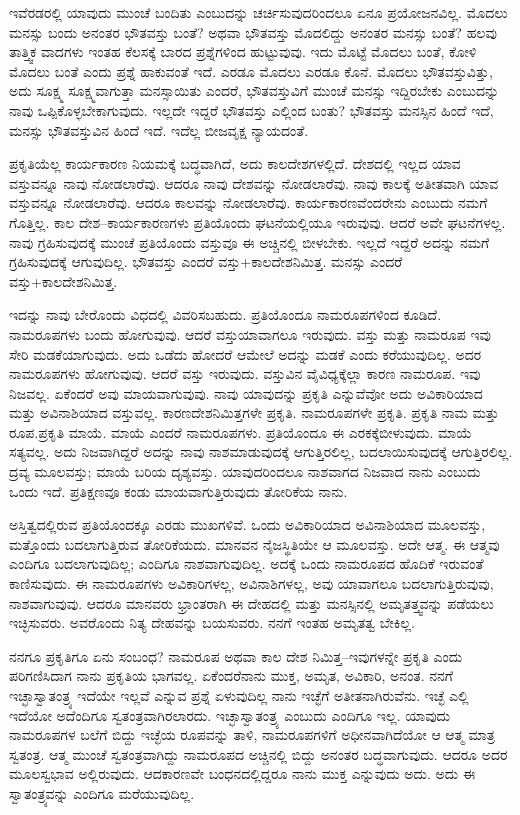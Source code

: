 ಇವೆರಡರಲ್ಲಿ ಯಾವುದು ಮುಂಚೆ ಬಂದಿತು ಎಂಬುದನ್ನು ಚರ್ಚಿಸುವುದರಿಂದಲೂ ಏನೂ ಪ್ರಯೋಜನವಿಲ್ಲ. ಮೊದಲು ಮನಸ್ಸು ಬಂದು ಅನಂತರ ಭೌತವಸ್ತು ಬಂತೆ? ಅಥವಾ ಭೌತವಸ್ತು ಮೊದಲಿದ್ದು ಅನಂತರ ಮನಸ್ಸು ಬಂತೆ? ಹಲವು ತಾತ್ತ್ವಿಕ ವಾದಗಳು ಇಂತಹ ಕೆಲಸಕ್ಕೆ ಬಾರದ ಪ್ರಶ್ನೆಗಳಿಂದ ಹುಟ್ಟುವುವು. ಇದು ಮೊಟ್ಟೆ ಮೊದಲು ಬಂತೆ, ಕೋಳಿ ಮೊದಲು ಬಂತೆ ಎಂದು ಪ್ರಶ್ನೆ ಹಾಕುವಂತೆ ಇದೆ. ಎರಡೂ ಮೊದಲು ಎರಡೂ ಕೊನೆ. ಮೊದಲು ಭೌತವಸ್ತುವಿತ್ತು, ಅದು ಸೂಕ್ಷ್ಮ ಸೂಕ್ಷ್ಮವಾಗುತ್ತಾ ಮನಸ್ಸಾಯಿತು ಎಂದರೆ, ಭೌತವಸ್ತುವಿಗೆ ಮುಂಚೆ ಮನಸ್ಸು ಇದ್ದಿರಬೇಕು ಎಂಬುದನ್ನು ನಾವು ಒಪ್ಪಿಕೊಳ್ಳಬೇಕಾಗುವುದು. ಇಲ್ಲದೇ ಇದ್ದರೆ ಭೌತವಸ್ತು ಎಲ್ಲಿಂದ ಬಂತು? ಭೌತವಸ್ತು ಮನಸ್ಸಿನ ಹಿಂದೆ ಇದೆ, ಮನಸ್ಸು ಭೌತವಸ್ತುವಿನ ಹಿಂದೆ ಇದೆ. ಇದೆಲ್ಲ ಬೀಜವೃಕ್ಷ ನ್ಯಾಯದಂತೆ.

ಪ್ರಕೃತಿಯೆಲ್ಲ ಕಾರ್ಯಕಾರಣ ನಿಯಮಕ್ಕೆ ಬದ್ಧವಾಗಿದೆ, ಅದು ಕಾಲದೇಶಗಳಲ್ಲಿದೆ. ದೇಶದಲ್ಲಿ ಇಲ್ಲದ ಯಾವ ವಸ್ತುವನ್ನೂ ನಾವು ನೋಡಲಾರೆವು. ಆದರೂ ನಾವು ದೇಶವನ್ನು ನೋಡಲಾರೆವು. ನಾವು ಕಾಲಕ್ಕೆ ಅತೀತವಾಗಿ ಯಾವ ವಸ್ತುವನ್ನೂ ನೋಡಲಾರೆವು. ಆದರೂ ಕಾಲವನ್ನು ನೋಡಲಾರೆವು. ಕಾರ್ಯಕಾರಣವೆಂದರೇನು ಎಂಬುದು ನಮಗೆ ಗೊತ್ತಿಲ್ಲ. ಕಾಲ ದೇಶ–ಕಾರ್ಯಕಾರಣಗಳು ಪ್ರತಿಯೊಂದು ಘಟನೆಯಲ್ಲಿಯೂ ಇರುವುವು. ಆದರೆ ಅವೇ ಘಟನೆಗಳಲ್ಲ. ನಾವು ಗ್ರಹಿಸುವುದಕ್ಕೆ ಮುಂಚೆ ಪ್ರತಿಯೊಂದು ವಸ್ತುವೂ ಈ ಅಚ್ಚಿನಲ್ಲಿ ಬೀಳಬೇಕು. ಇಲ್ಲದೆ ಇದ್ದರೆ ಅದನ್ನು ನಮಗೆ ಗ್ರಹಿಸುವುದಕ್ಕೆ ಆಗುವುದಿಲ್ಲ. ಭೌತವಸ್ತು ಎಂದರೆ ವಸ್ತು+ಕಾಲದೇಶನಿಮಿತ್ತ. ಮನಸ್ಸು ಎಂದರೆ ವಸ್ತು+ಕಾಲದೇಶನಿಮಿತ್ತ.

ಇದನ್ನು ನಾವು ಬೇರೊಂದು ವಿಧದಲ್ಲಿ ವಿವರಿಸಬಹುದು. ಪ್ರತಿಯೊಂದೂ ನಾಮರೂಪಗಳಿಂದ ಕೂಡಿದೆ. ನಾಮರೂಪಗಳು ಬಂದು ಹೋಗುವುವು. ಆದರೆ ವಸ್ತು\break ಯಾವಾಗಲೂ ಇರುವುದು. ವಸ್ತು ಮತ್ತು ನಾಮರೂಪ ಇವು ಸೇರಿ ಮಡಕೆಯಾಗುವುದು. ಅದು ಒಡೆದು ಹೋದರೆ ಆಮೇಲೆ ಅದನ್ನು ಮಡಕೆ ಎಂದು ಕರೆಯುವುದಿಲ್ಲ. ಅದರ ನಾಮರೂಪಗಳು ಹೋಗುವುವು. ಆದರೆ ವಸ್ತು ಇರುವುದು. ವಸ್ತುವಿನ ವೈವಿಧ್ಯಕ್ಕೆಲ್ಲಾ ಕಾರಣ ನಾಮರೂಪ. ಇವು ನಿಜವಲ್ಲ. ಏಕೆಂದರೆ ಅವು ಮಾಯವಾಗುವುವು. ನಾವು ಯಾವುದನ್ನು ಪ್ರಕೃತಿ ಎನ್ನುವೆವೋ ಅದು ಅವಿಕಾರಿಯಾದ ಮತ್ತು ಅವಿನಾಶಿಯಾದ ವಸ್ತುವಲ್ಲ. ಕಾರಣದೇಶನಿಮಿತ್ತಗಳೇ ಪ್ರಕೃತಿ. ನಾಮರೂಪಗಳೇ ಪ್ರಕೃತಿ. ಪ್ರಕೃತಿ ನಾಮ ಮತ್ತು ರೂಪ.\break ಪ್ರಕೃತಿ ಮಾಯೆ. ಮಾಯೆ ಎಂದರೆ ನಾಮರೂಪಗಳು. ಪ್ರತಿಯೊಂದೂ ಈ ಎರಕಕ್ಕೆ\break ಬೀಳುವುದು. ಮಾಯೆ ಸತ್ಯವಲ್ಲ. ಅದು ನಿಜವಾಗಿದ್ದರೆ ಅದನ್ನು ನಾವು ನಾಶಮಾಡುವುದಕ್ಕೆ ಆಗುತ್ತಿರಲಿಲ್ಲ, ಬದಲಾಯಿಸುವುದಕ್ಕೆ ಆಗುತ್ತಿರಲಿಲ್ಲ. ದ್ರವ್ಯ ಮೂಲವಸ್ತು; ಮಾಯೆ ಬರಿಯ ದೃಶ್ಯವಸ್ತು. ಯಾವುದರಿಂದಲೂ ನಾಶವಾಗದ ನಿಜವಾದ ನಾನು ಎಂಬುದು ಒಂದು ಇದೆ. ಪ್ರತಿಕ್ಷಣವೂ ಕಂಡು ಮಾಯವಾಗುತ್ತಿರುವುದು ತೋರಿಕೆಯ ನಾನು.

ಅಸ್ತಿತ್ವದಲ್ಲಿರುವ ಪ್ರತಿಯೊಂದಕ್ಕೂ ಎರಡು ಮುಖಗಳಿವೆ. ಒಂದು ಅವಿಕಾರಿಯಾದ ಅವಿನಾಶಿಯಾದ ಮೂಲವಸ್ತು, ಮತ್ತೊಂದು ಬದಲಾಗುತ್ತಿರುವ ತೋರಿಕೆಯದು. ಮಾನ\-ವನ ನೈಜಸ್ಥಿತಿಯೇ ಆ ಮೂಲವಸ್ತು. ಅದೇ ಆತ್ಮ. ಈ ಆತ್ಮವು ಎಂದಿಗೂ ಬದಲಾಗುವುದಿಲ್ಲ; ಎಂದಿಗೂ ನಾಶವಾಗುವುದಿಲ್ಲ. ಅದಕ್ಕೆ ಒಂದು ನಾಮರೂಪದ ಹೊದಿಕೆ ಇರುವಂತೆ ಕಾಣಿಸುವುದು. ಈ ನಾಮರೂಪಗಳು ಅವಿಕಾರಿಗಳಲ್ಲ, ಅವಿನಾಶಿಗಳಲ್ಲ, ಅವು ಯಾವಾಗಲೂ ಬದಲಾಗುತ್ತಿರುವುವು, ನಾಶವಾಗುವುವು. ಆದರೂ ಮಾನವರು ಭ್ರಾಂತರಾಗಿ ಈ ದೇಹದಲ್ಲಿ ಮತ್ತು ಮನಸ್ಸಿನಲ್ಲಿ ಅಮೃತತ್ತ್ವವನ್ನು ಪಡೆಯಲು ಇಚ್ಛಿಸುವರು. ಅವರೊಂದು ನಿತ್ಯ ದೇಹವನ್ನು ಬಯಸುವರು. ನನಗೆ ಇಂತಹ ಅಮೃತತ್ವ ಬೇಕಿಲ್ಲ.

ನನಗೂ ಪ್ರಕೃತಿಗೂ ಏನು ಸಂಬಂಧ? ನಾಮರೂಪ ಅಥವಾ ಕಾಲ ದೇಶ ನಿಮಿತ್ತ–ಇವುಗಳನ್ನೇ ಪ್ರಕೃತಿ ಎಂದು ಪರಿಗಣಿಸಿದಾಗ ನಾನು ಪ್ರಕೃತಿಯ ಭಾಗವಲ್ಲ. ಏಕೆಂದರೆ\break ನಾನು ಮುಕ್ತ, ಅಮೃತ, ಅವಿಕಾರಿ, ಅನಂತ. ನನಗೆ ಇಚ್ಛಾಸ್ವಾತಂತ್ರ್ಯ ಇದೆಯೇ ಇಲ್ಲವೆ ಎನ್ನುವ ಪ್ರಶ್ನೆ ಏಳುವುದಿಲ್ಲ ನಾನು ಇಚ್ಛೆಗೆ ಅತೀತನಾಗಿರುವೆನು. ಇಚ್ಛೆ ಎಲ್ಲಿ ಇದೆಯೋ ಅದೆಂದಿಗೂ ಸ್ವತಂತ್ರವಾಗಿರಲಾರದು. ಇಚ್ಛಾಸ್ವಾತಂತ್ರ್ಯ ಎಂಬುದು ಎಂದಿಗೂ ಇಲ್ಲ. ಯಾವುದು ನಾಮರೂಪಗಳ ಬಲೆಗೆ ಬಿದ್ದು ಇಚ್ಛೆಯ ರೂಪವನ್ನು ತಾಳಿ, ನಾಮರೂಪಗಳಿಗೆ ಅಧೀನವಾಗಿದೆಯೋ ಆ ಆತ್ಮ ಮಾತ್ರ ಸ್ವತಂತ್ರ. ಆತ್ಮ ಮುಂಚೆ ಸ್ವತಂತ್ರವಾಗಿದ್ದು ನಾಮರೂಪದ ಅಚ್ಚಿನಲ್ಲಿ ಬಿದ್ದು ಅನಂತರ ಬದ್ಧವಾಗುವುದು. ಆದರೂ ಅದರ ಮೂಲಸ್ವಭಾವ ಅಲ್ಲಿರುವುದು. ಆದಕಾರಣವೇ ಬಂಧನದಲ್ಲಿದ್ದರೂ ನಾನು ಮುಕ್ತ ಎನ್ನುವುದು ಅದು. ಅದು ಈ ಸ್ವಾತಂತ್ರ್ಯವನ್ನು ಎಂದಿಗೂ ಮರೆಯುವುದಿಲ್ಲ.

